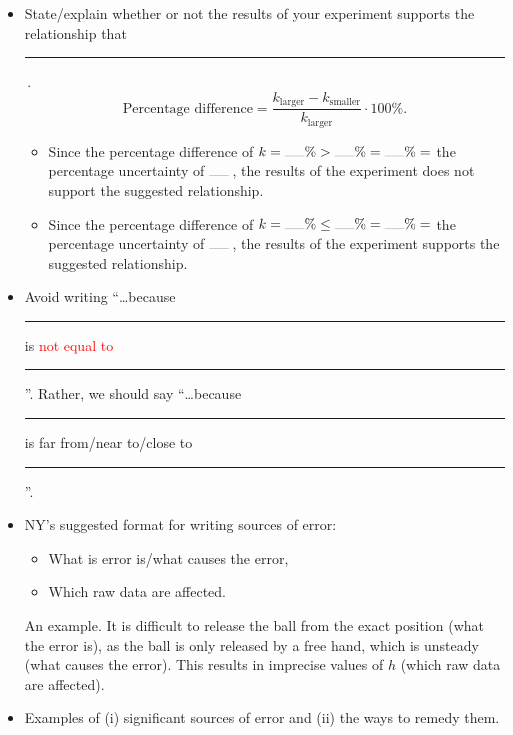\documentclass[oneside]{book}
\begin{document}
\begin{itemize}
    \item State/explain whether or not the results of your experiment supports the relationship that \rule{1cm}{0.05mm}\,.
    \[\text{Percentage difference}=\frac{k_{\text{larger}}-k_{\text{smaller}}}{k_{\text{larger}}}\cdot 100\%.\]
    \begin{itemize}
        \item Since the percentage difference of \(k=\rule{0.5cm}{0.05mm}\%>\rule{0.5cm}{0.05mm}\%=\rule{0.5cm}{0.05mm}\%={}\)the percentage uncertainty of \(\rule{0.5cm}{0.05mm}\)\,, the results of the experiment does not support the suggested relationship.
        \item Since the percentage difference of \(k=\rule{0.5cm}{0.05mm}\%\leq\rule{0.5cm}{0.05mm}\%=\rule{0.5cm}{0.05mm}\%={}\)the percentage uncertainty of \(\rule{0.5cm}{0.05mm}\)\,, the results of the experiment supports the suggested relationship.
    \end{itemize}
    \item Avoid writing ``\dots because \rule{0.5cm}{0.05mm} is \textcolor{red}{not equal to} \rule{0.5cm}{0.05mm}''. Rather, we should say ``\dots because \rule{0.5cm}{0.05mm} is \textcolor{green!70!black}{far from/near to/close to} \rule{0.5cm}{0.05mm}''.
    \item NY's suggested format for writing sources of error:
    \begin{itemize}
        \item What is error is/what causes the error, 
        \item Which raw data are affected.
    \end{itemize}
    An example. It is difficult to release the ball from the exact position (what the error is), as the ball is only released by a free hand, which is unsteady (what causes the error). This results in imprecise values of \(h\) (which raw data are affected).
    \item Examples of (i) significant sources of error and (ii) the ways to remedy them.

\end{itemize}
\end{document}
